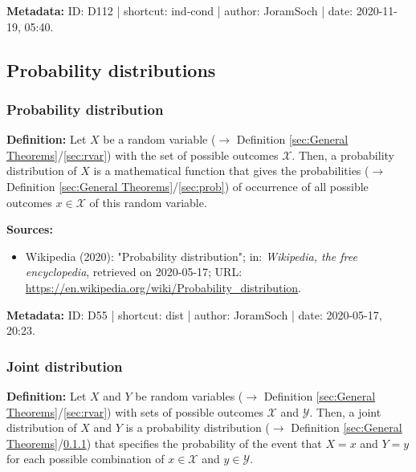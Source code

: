 \documentclass[a4paper,12pt,twoside]{book}
\begin{document}
\vspace{1em}
\textbf{Metadata:} ID: D112 | shortcut: ind-cond | author: JoramSoch | date: 2020-11-19, 05:40.
\vspace{1em}



\subsection{Probability distributions}

\subsubsection[\textit{Probability distribution}]{Probability distribution} \label{sec:dist}
\setcounter{equation}{0}

\textbf{Definition:} Let $X$ be a random variable ($\rightarrow$ Definition \ref{sec:General Theorems}/\ref{sec:rvar}) with the set of possible outcomes $\mathcal{X}$. Then, a probability distribution of $X$ is a mathematical function that gives the probabilities ($\rightarrow$ Definition \ref{sec:General Theorems}/\ref{sec:prob}) of occurrence of all possible outcomes $x \in \mathcal{X}$ of this random variable.


\vspace{1em}
\textbf{Sources:}
\begin{itemize}
\item Wikipedia (2020): "Probability distribution"; in: \textit{Wikipedia, the free encyclopedia}, retrieved on 2020-05-17; URL: \url{https://en.wikipedia.org/wiki/Probability_distribution}.
\end{itemize}


\vspace{1em}
\textbf{Metadata:} ID: D55 | shortcut: dist | author: JoramSoch | date: 2020-05-17, 20:23.
\vspace{1em}



\subsubsection[\textit{Joint distribution}]{Joint distribution} \label{sec:dist-joint}
\setcounter{equation}{0}

\textbf{Definition:} Let $X$ and $Y$ be random variables ($\rightarrow$ Definition \ref{sec:General Theorems}/\ref{sec:rvar}) with sets of possible outcomes $\mathcal{X}$ and $\mathcal{Y}$. Then, a joint distribution of $X$ and $Y$ is a probability distribution ($\rightarrow$ Definition \ref{sec:General Theorems}/\ref{sec:dist}) that specifies the probability of the event that $X = x$ and $Y = y$ for each possible combination of $x \in \mathcal{X}$ and $y \in \mathcal{Y}$.
\end{document}
